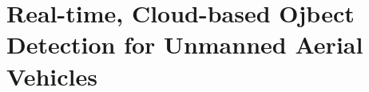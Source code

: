 \documentclass{iuphd_proposal}
\begin{document}
\chapter{Real-time, Cloud-based Ojbect Detection for Unmanned Aerial Vehicles}

% 
% 
% 
% 
% 
% 
% 
% 
% 





%
\end{document}
